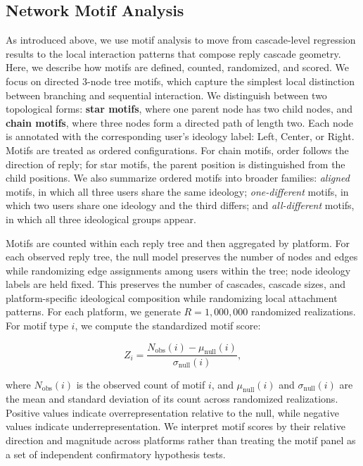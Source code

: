 \documentclass[letterpaper]{article} %
\begin{document}
\subsection{Network Motif Analysis}
As introduced above, we use motif analysis to move from cascade-level regression results to the local interaction patterns that compose reply cascade geometry. Here, we describe how motifs are defined, counted, randomized, and scored. We focus on directed 3-node tree motifs, which capture the simplest local distinction between branching and sequential interaction. We distinguish between two topological forms: \textbf{star motifs}, where one parent node has two child nodes, and \textbf{chain motifs}, where three nodes form a directed path of length two. Each node is annotated with the corresponding user's ideology label: Left, Center, or Right. Motifs are treated as ordered configurations. For chain motifs, order follows the direction of reply; for star motifs, the parent position is distinguished from the child positions. We also summarize ordered motifs into broader families: \textit{aligned} motifs, in which all three users share the same ideology; \textit{one-different} motifs, in which two users share one ideology and the third differs; and \textit{all-different} motifs, in which all three ideological groups appear.

Motifs are counted within each reply tree and then aggregated by platform. For each observed reply tree, the null model preserves the number of nodes and edges while randomizing edge assignments among users within the tree; node ideology labels are held fixed. This preserves the number of cascades, cascade sizes, and platform-specific ideological composition while randomizing local attachment patterns. For each platform, we generate $R=1{,}000{,}000$ randomized realizations. For motif type $i$, we compute the standardized motif score:

\[
Z_i = \frac{N_{\mathrm{obs}}(i) - \mu_{\mathrm{null}}(i)}{\sigma_{\mathrm{null}}(i)} ,
\]

where $N_{\mathrm{obs}}(i)$ is the observed count of motif $i$, and $\mu_{\mathrm{null}}(i)$ and $\sigma_{\mathrm{null}}(i)$ are the mean and standard deviation of its count across randomized realizations. Positive values indicate overrepresentation relative to the null, while negative values indicate underrepresentation. We interpret motif scores by their relative direction and magnitude across platforms rather than treating the motif panel as a set of independent confirmatory hypothesis tests.
\end{document}
